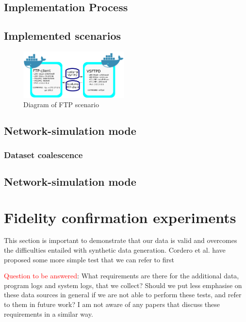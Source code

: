 \documentclass[sigconf]{acmart}
\begin{document}
\subsection{Implementation Process}

 
\subsection{Implemented scenarios}\label{Sec:ExistScen}


\begin{figure}%
\centering
\includegraphics[width=0.49\textwidth]{images/ftp_new1.png}
\caption{Diagram of FTP scenario}
\end{figure}


\subsection{Network-simulation mode}

\subsubsection{Dataset coalescence}\label{Sec:datasetcreation}


\subsection{Network-simulation mode}




\section{Fidelity confirmation experiments}\label{Sec:Experiments}

This section is important to demonstrate that our data is valid and overcomes the difficulties entailed with synthetic data generation. Cordero et al. have proposed some more simple test that we can refer to first

\textcolor{red}{Question to be answered}: What requirements are there for the additional data, program logs and system logs, that we collect? Should we put less emphasise on these data sources in general if we are not able to perform these tests, and refer to them in future work? I am not aware of any papers that discuss these requirements in a similar way. 
\end{document}
